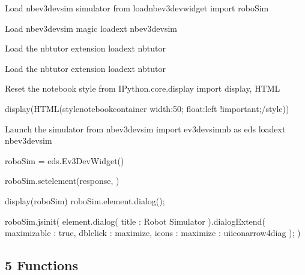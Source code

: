 \documentclass[letterpaper,10pt,english]{sphinxmanual}
\begin{document}
{{\begin{sphinxVerbatim}[commandchars=\\\{\}]
\PYGZsh{} Load nbev3devsim simulator
from \PYGZus{}load\PYGZus{}nbev3devwidget import roboSim

\PYGZsh{}Load nbev3devsim magic
\PYGZpc{}load\PYGZus{}ext nbev3devsim

\PYGZsh{}Load the nbtutor extension
\PYGZpc{}load\PYGZus{}ext nbtutor
\end{sphinxVerbatim}
}

{
\begin{sphinxVerbatim}[commandchars=\\\{\}]
\llap{\color{nbsphinxin}[ ]:\,\hspace{\fboxrule}\hspace{\fboxsep}}\PYGZsh{}Load the nbtutor extension
\PYGZpc{}load\PYGZus{}ext nbtutor

\PYGZsh{}Reset the notebook style
from IPython.core.display import display, HTML

display(HTML(\PYGZdq{}\PYGZlt{}style\PYGZgt{}\PYGZsh{}notebook\PYGZhy{}container \PYGZob{} width:50\PYGZpc{}; float:left !important;\PYGZcb{}\PYGZlt{}/style\PYGZgt{}\PYGZdq{}))


\PYGZsh{}Launch the simulator
from nbev3devsim import ev3devsim\PYGZus{}nb as eds
\PYGZpc{}load\PYGZus{}ext nbev3devsim

roboSim = eds.Ev3DevWidget()

roboSim.set\PYGZus{}element(\PYGZdq{}response\PYGZdq{}, \PYGZsq{}\PYGZsq{})

display(roboSim)
roboSim.element.dialog();


roboSim.js\PYGZus{}init(\PYGZdq{}\PYGZdq{}\PYGZdq{}
element.dialog(\PYGZob{} \PYGZdq{}title\PYGZdq{} : \PYGZdq{}Robot Simulator\PYGZdq{} \PYGZcb{}).dialogExtend(\PYGZob{}
        \PYGZdq{}maximizable\PYGZdq{} : true,
        \PYGZdq{}dblclick\PYGZdq{} : \PYGZdq{}maximize\PYGZdq{},
        \PYGZdq{}icons\PYGZdq{} : \PYGZob{} \PYGZdq{}maximize\PYGZdq{} : \PYGZdq{}ui\PYGZhy{}icon\PYGZhy{}arrow\PYGZhy{}4\PYGZhy{}diag\PYGZdq{} \PYGZcb{}\PYGZcb{});
\PYGZdq{}\PYGZdq{}\PYGZdq{})
\end{sphinxVerbatim}
}


\subsection{5 Functions}
\label{\detokenize{content/03_Robot_Lab/Section_00_05:5-Functions}}\label{\detokenize{content/03_Robot_Lab/Section_00_05::doc}}

}
\end{document}

